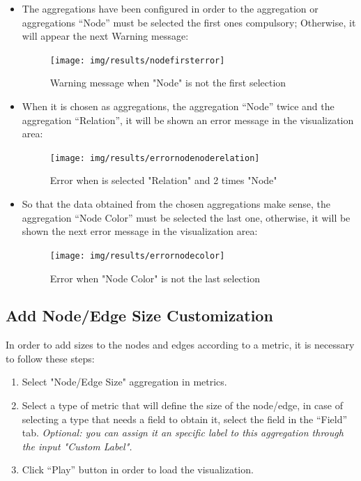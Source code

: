 \documentclass[a4paper, 12pt]{book}
\begin{document}
\begin{itemize}
\item The aggregations have been configured in order to the aggregation or aggregations “Node” must be selected the first ones compulsory; Otherwise, it will appear the next Warning message: 
 
\begin{figure}[H]
  \centering
  \texttt{[image: img/results/nodefirsterror]}
  \caption{Warning message when "Node" is not the first selection}
  \label{fig:noderror}
\end{figure}

\item When it is chosen as aggregations, the aggregation “Node” twice and the aggregation “Relation”, it will be shown an error message in the visualization area:

\begin{figure}[H]
  \centering
  \texttt{[image: img/results/errornodenoderelation]}
  \caption{Error when is selected "Relation" and 2 times "Node"}
  \label{fig:errornodenoderelation}
\end{figure}

\item So that the data obtained from the chosen aggregations make sense, the aggregation “Node Color” must be selected the last one, otherwise, it will be shown the next error message in the visualization area:
 
\begin{figure}[H]
  \centering
  \texttt{[image: img/results/errornodecolor]}
  \caption{Error when "Node Color" is not the last selection}
  \label{fig:errornodecolor}
\end{figure}

\end{itemize}

\subsection{Add Node/Edge Size Customization}

In order to add sizes to the nodes and edges according to a metric, it is necessary to follow these steps:

\begin{enumerate}
\item Select "Node/Edge Size" aggregation in metrics.
\item Select a type of metric that will define the size of the node/edge, in case of selecting a type that needs a field to obtain it, select the field in the “Field” tab. \textit{Optional: you can assign it an specific label to this aggregation through the input "Custom Label".}
\item Click “Play” button in order to load the visualization.
\end{enumerate}
\end{document}
